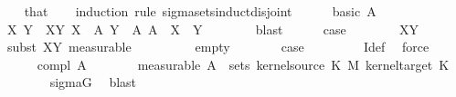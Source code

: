 \begin{isabellebody}
\ \ \isamarkupfalse%
\ that\isanewline
\ \ \isamarkupfalse%
\ {\isacharparenleft}{\kern0pt}induction\ rule{\isacharcolon}{\kern0pt}\ sigma{\isacharunderscore}{\kern0pt}sets{\isacharunderscore}{\kern0pt}induct{\isacharunderscore}{\kern0pt}disjoint{\isacharparenright}{\kern0pt}\isanewline
\ \ \ \ \isamarkupfalse%
\ {\isacharparenleft}{\kern0pt}basic\ A{\isacharparenright}{\kern0pt}\isanewline
\ \ \ \ \isamarkupfalse%
\ \isamarkupfalse%
\ X\ Y\ \ XY{\isacharcolon}{\kern0pt}\ {\isachardoublequoteopen}X\ {\isasymin}\ {\isacharquery}{\kern0pt}A\ {\isachardoublequoteopen}Y\ {\isasymin}\ {\isacharquery}{\kern0pt}A\ {\isachardoublequoteopen}A\ {\isacharequal}{\kern0pt}\ X\ {\isasymtimes}\ Y{\isachardoublequoteclose}\isanewline
\ \ \ \ \ \ \isamarkupfalse%
\ blast\isanewline
\ \ \ \ \isamarkupfalse%
\ {\isacharquery}{\kern0pt}case\isanewline
\ \ \ \ \ \ \isamarkupfalse%
\ XY{\isacharparenleft}{\kern0pt}{}{\isacharcomma}{\kern0pt}{}{\isacharparenright}{\kern0pt}\ \isamarkupfalse%
\ {\isacharparenleft}{\kern0pt}subst\ XY{\isacharparenleft}{\kern0pt}{}{\isacharparenright}{\kern0pt}{\isacharcomma}{\kern0pt}\ measurable{\isacharparenright}{\kern0pt}\ \isanewline
\ \ \isamarkupfalse%
\isanewline
\ \ \ \ \isamarkupfalse%
\ empty\isanewline
\ \ \ \ \isamarkupfalse%
\ \isamarkupfalse%
\ {\isacharquery}{\kern0pt}case\isanewline
\ \ \ \ \ \ \ \isamarkupfalse%
\ I{\isacharunderscore}{\kern0pt}def\ \isamarkupfalse%
\ force\isanewline
\ \ \isamarkupfalse%
\isanewline
\ \ \ \ \isamarkupfalse%
\ {\isacharparenleft}{\kern0pt}compl\ A{\isacharparenright}{\kern0pt}\isanewline
\ \ \ \ \isamarkupfalse%
\ \isamarkupfalse%
\ {\isacharbrackleft}{\kern0pt}measurable{\isacharbrackright}{\kern0pt}{\isacharcolon}{\kern0pt}\ {\isachardoublequoteopen}A\ {\isasymin}\ sets\ {\isacharparenleft}{\kern0pt}kernel{\isacharunderscore}{\kern0pt}source\ K\ {\isasymOtimes}\isactrlsub M\ kernel{\isacharunderscore}{\kern0pt}target\ K{\isacharparenright}{\kern0pt}{\isachardoublequoteclose}\isanewline
\ \ \ \ \ \ \isamarkupfalse%
\ sigma{\isacharunderscore}{\kern0pt}G\ \isamarkupfalse%
\ blast\isanewline

\end{isabellebody}
